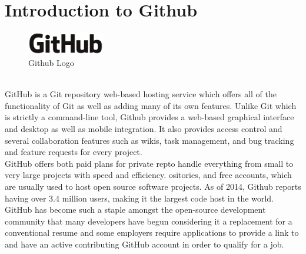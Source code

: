 
\section{Introduction to Github}
\begin{figure}[!ht]
\centering
\includegraphics[width=0.3\textwidth]{images/github.png}                   
\caption{Github Logo}
\hspace{-1.5em}
\end{figure}
\leavevmode\\
GitHub is a Git repository web-based hosting service which offers all of the functionality of Git as well as adding many of its own features. Unlike Git which is strictly a command-line tool, Github provides a web-based graphical interface and desktop as well as mobile integration. It also provides access control and several collaboration features such as wikis, task management, and bug tracking and feature requests for every project.\\

GitHub offers both paid plans for private repto handle everything from small to very large projects with speed and efficiency. ositories, and free accounts, which are usually used to host open source software projects. As of 2014, Github reports having over 3.4 million users, making it the largest code host in the world.\\

GitHub has become such a staple amongst the open-source development community that many developers have begun considering it a replacement for a conventional resume and some employers require applications to provide a link to and have an active contributing GitHub account in order to qualify for a job.\\

